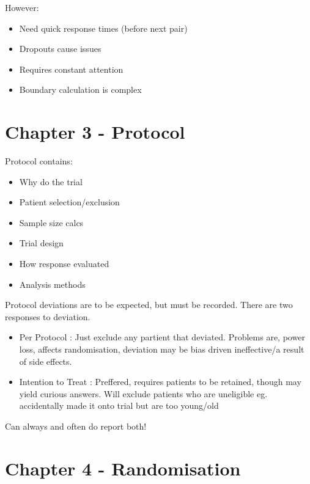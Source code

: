 \documentclass[
  letterpaper,
  DIV=11,
  numbers=noendperiod]{scrreprt}
\providecommand{\tightlist}{%
  \setlength{\itemsep}{0pt}\setlength{\parskip}{0pt}}\usepackage{longtable,booktabs,array}
\begin{document}
However:

\begin{itemize}
\tightlist
\item
  Need quick response times (before next pair)
\item
  Dropouts cause issues
\item
  Requires constant attention
\item
  Boundary calculation is complex
\end{itemize}

\hypertarget{chapter-3---protocol}{%
\section{Chapter 3 - Protocol}\label{chapter-3---protocol}}

Protocol contains:

\begin{itemize}
\tightlist
\item
  Why do the trial
\item
  Patient selection/exclusion
\item
  Sample size calcs
\item
  Trial design
\item
  How response evaluated
\item
  Analysis methods
\end{itemize}

Protocol deviations are to be expected, but must be recorded. There are
two responses to deviation.

\begin{itemize}
\tightlist
\item
  Per Protocol : Just exclude any partient that deviated. Problems are,
  power loss, affects randomisation, deviation may be bias driven
  ineffective/a result of side effects.
\item
  Intention to Treat : Preffered, requires patients to be retained,
  though may yield curious answers. Will exclude patients who are
  uneligible eg. accidentally made it onto trial but are too young/old
\end{itemize}

Can always and often do report both!

\hypertarget{chapter-4---randomisation}{%
\section{Chapter 4 - Randomisation}\label{chapter-4---randomisation}}
\end{document}
